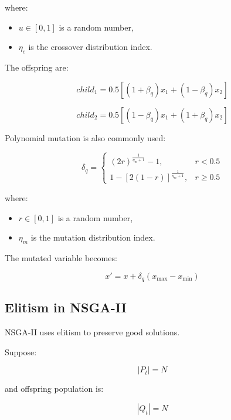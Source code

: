 \documentclass[11pt]{article}
\begin{document}
where:
\begin{itemize}
    \item $u \in [0,1]$ is a random number,
    \item $\eta_c$ is the crossover distribution index.
\end{itemize}

The offspring are:

\begin{equation}
child_1 = 0.5[(1+\beta_q)x_1 + (1-\beta_q)x_2]
\end{equation}

\begin{equation}
child_2 = 0.5[(1-\beta_q)x_1 + (1+\beta_q)x_2]
\end{equation}

Polynomial mutation is also commonly used:

\begin{equation}
\delta_q =
\begin{cases}
(2r)^{\frac{1}{\eta_m+1}} - 1, & r < 0.5 \\
1 - [2(1-r)]^{\frac{1}{\eta_m+1}}, & r \geq 0.5
\end{cases}
\end{equation}

where:
\begin{itemize}
    \item $r \in [0,1]$ is a random number,
    \item $\eta_m$ is the mutation distribution index.
\end{itemize}

The mutated variable becomes:

\begin{equation}
x' = x + \delta_q(x_{\max} - x_{\min})
\end{equation}

\subsection{Elitism in NSGA-II}

NSGA-II uses elitism to preserve good solutions.

Suppose:

\begin{equation}
|P_t| = N
\end{equation}

and offspring population is:

\begin{equation}
|Q_t| = N
\end{equation}
\end{document}
